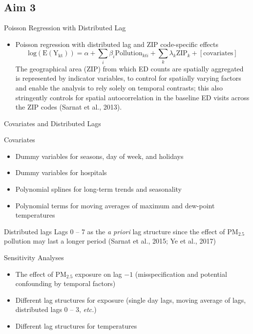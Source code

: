 \documentclass[handout]{beamer} %
\begin{document}
\subsection*{Aim 3}

\begin{frame}{Poisson Regression with Distributed Lag}
    \begin{itemize}
        \item Poisson regression with distributed lag and ZIP code-specific effects
            \begin{equation*}
                \mathrm{log(E(Y_{kt}))}=\alpha+\sum_i\beta_i\mathrm{Pollution}_{kti}+\sum_k\lambda_k\mathrm{ZIP}_k+[\mathrm{covariates}]
            \end{equation*}
        \textcolor[rgb]{0.1,0.1,0.6}{The geographical area (ZIP) from which ED counts are spatially aggregated is represented by indicator variables, to control for spatially varying factors and enable the analysis to rely solely on temporal contrasts; this also stringently controls for spatial autocorrelation in the baseline ED visits across the ZIP codes (Sarnat et al., 2013).}
    \end{itemize}
\end{frame}

\begin{frame}{Covariates and Distributed Lags}
    \begin{block}{Covariates}
        \begin{itemize}
            \item Dummy variables for seasons, day of week, and holidays
            \item Dummy variables for hospitals
            \item Polynomial splines for long-term trends and seasonality
            \item Polynomial terms for moving averages of maximum and dew-point temperatures
        \end{itemize}
    \end{block}
    \begin{block}{Distributed lags}
        Lags 0 -- 7 as the \textit{a priori} lag structure since the effect of PM$_{2.5}$ pollution may last a longer period (Sarnat et al., 2015; Ye et al., 2017)
    \end{block}
\end{frame}

\begin{frame}{Sensitivity Analyses}
    \begin{itemize}
        \item The effect of PM$_{2.5}$ exposure on lag $-1$ (misspecification and potential confounding by temporal factors)
        \item Different lag structures for exposure (single day lags, moving average of lags, distributed lags 0 -- 3, \textit{etc.})
        \item Different lag structures for temperatures
    \end{itemize}
\end{frame}
\end{document}
